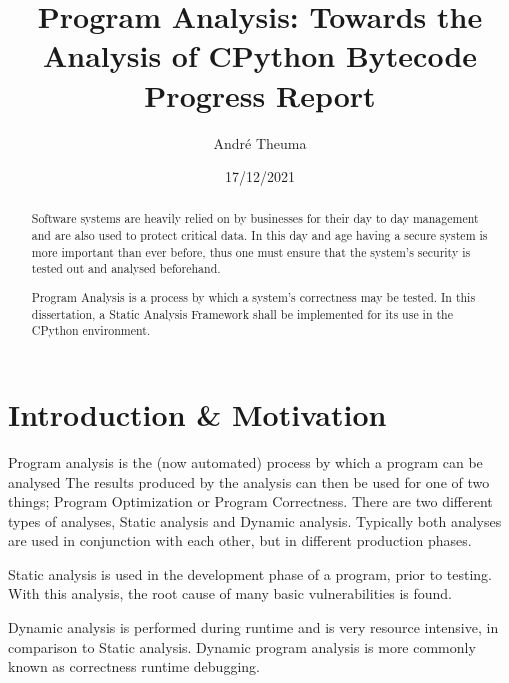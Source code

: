 \documentclass[12pt, a4paper]{report}
\theoremstyle{definition}
\theoremstyle{definition}%
\theoremstyle{definition}%
\theoremstyle{definition}%
\theoremstyle{definition}%
\theoremstyle{definition}%
\begin{document}
\title{Program Analysis: Towards the Analysis of CPython Bytecode
    \large{Progress Report}
}
\author{André Theuma}
\date{17/12/2021}

\frontmatterprogreport

\begin{abstract}
    \par Software systems are heavily relied on by businesses for their day to day management and are also used to protect critical data.
    In this day and age having a secure system is more important than ever before, thus one must ensure that the system's security is tested out and analysed beforehand.
    \par Program Analysis is a process by which a system's correctness may be tested. In this dissertation, a Static Analysis Framework shall be implemented for its use in the
    CPython environment.

\end{abstract}

\tableofcontents

\listoffigures
\restoregeometry




\mainmatter

\chapter{Introduction \& Motivation}
    \par Program analysis is the (now automated) process by which a program can be analysed %
    The results produced 
    by the analysis can then be used for one of two things; Program Optimization or Program Correctness. There are two different
    types of analyses, Static analysis and Dynamic analysis. Typically both analyses are used in conjunction with each other, but in different
    production phases. 
    \par Static analysis is used in the development phase of a program, prior to testing. With this analysis, the root cause 
    of many basic vulnerabilities is found.
    \par Dynamic analysis is performed during runtime and is very resource intensive, in comparison to Static analysis. 
    Dynamic program analysis is more commonly known as correctness runtime debugging. %
\end{document}
